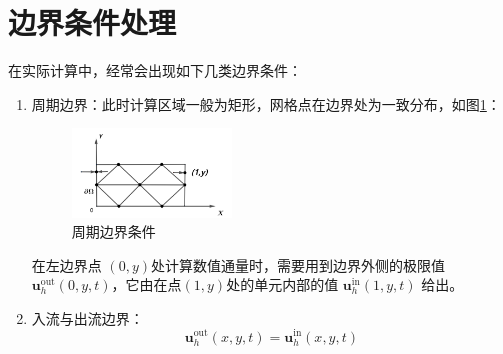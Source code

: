 \documentclass[a4paper, 12pt, UTF8]{ctexart}
\newcommand{\bs}[1]{\boldsymbol{#1}}
\begin{document}
\section{边界条件处理}
在实际计算中，经常会出现如下几类边界条件：
\begin{enumerate}
\item 周期边界：此时计算区域一般为矩形，网格点在边界处为一致分布，如图\ref{cycleboundary}：

\begin{figure}[h] 
	\centering
	\includegraphics[width=0.4\textwidth]{images/6.png} 
	\caption{周期边界条件}
	\label{cycleboundary} 
\end{figure}
在左边界点 $(0, y)$处计算数值通量时，需要用到边界外侧的极限值 $\bs u_{h}^{\text{out}}(0, y, t)$，它由在点$(1, y)$处的单元内部的值 $\bs u_{h}^{\text{in}}(1, y, t)$ 给出。
\item 入流与出流边界：
$$ \bs u_{h}^{\text {out}}(x, y, t)=\bs u_{h}^{\text {in}}(x, y, t)$$


\end{enumerate}
\end{document}
